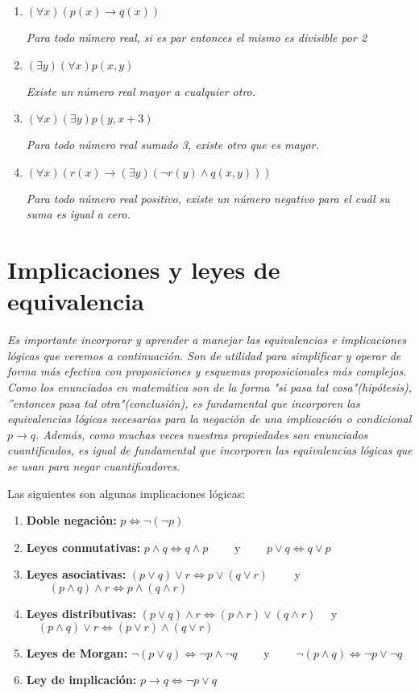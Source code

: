 \begin{enumerate}
	\item $(\forall x)(p(x) \rightarrow q(x))$
	
	\textit{Para todo n\'umero real, si es par entonces el mismo es divisible por 2}
	
	\item $(\exists y)(\forall x)p(x,y)$
	
	\textit{Existe un n\'umero real mayor a cualquier otro.}
	
	\item $(\forall x)(\exists y)p(y, x+3)$
	
	\textit{Para todo n\'umero real sumado 3, existe otro que es mayor.}
	
	\item $(\forall x)\left(r(x) \rightarrow (\exists y)(\neg r(y) \wedge q(x,y))\right)$
	
	\textit{Para todo n\'umero real positivo, existe un n\'umero negativo para el cu\'al su suma es igual a cero.}
\end{enumerate}

\section{Implicaciones y leyes de equivalencia}

\textit{Es importante incorporar y aprender a manejar las equivalencias e implicaciones lógicas que veremos a continuación. Son de utilidad para simplificar y operar de forma más efectiva con proposiciones y esquemas proposicionales más complejos. Como los enunciados en matemática son de la forma "si pasa tal cosa"(hipótesis), ”entonces pasa tal otra"(conclusión), es fundamental que incorporen las equivalencias lógicas necesarias para la negación de una implicación o condicional $p \rightarrow q$. Además, como muchas veces nuestras propiedades son enunciados cuantificados, es igual de
fundamental que incorporen las equivalencias lógicas que se usan para negar cuantificadores.}

Las siguientes son algunas implicaciones l\'ogicas:

\begin{enumerate}
	\item \textbf{Doble negaci\'on:} $p \Leftrightarrow \neg (\neg p)$
	\item \textbf{Leyes conmutativas:} $p \wedge q \Leftrightarrow q \wedge p\qquad$ y $\qquad p \vee q \Leftrightarrow q \vee p$
	\item \textbf{Leyes asociativas:} $(p \vee q) \vee r \Leftrightarrow p \vee (q \vee r)\qquad$ y $\qquad (p \wedge q) \wedge r \Leftrightarrow p \wedge (q \wedge r)$
	\item \textbf{Leyes distributivas:} $(p \vee q) \wedge r \Leftrightarrow (p \wedge r) \vee (q \wedge r)\quad$ y $\quad (p \wedge q) \vee r \Leftrightarrow (p \vee r) \wedge (q \vee r)$
	\item \textbf{Leyes de Morgan:} $\neg(p \vee q) \Leftrightarrow \neg p \wedge \neg q \qquad$ y $\qquad \neg(p \wedge q) \Leftrightarrow \neg p \vee \neg q$
	\item \textbf{Ley de implicaci\'on:} $p \rightarrow q \Leftrightarrow \neg p \vee q$
\end{enumerate}

